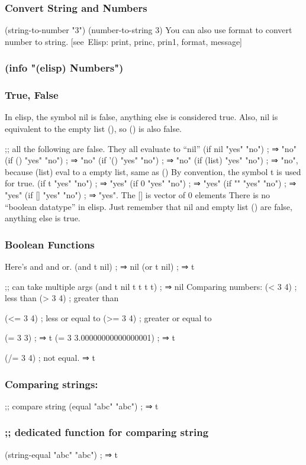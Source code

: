 \documentclass[11pt]{ctexart}
\begin{document}
{{{{\subsubsection{Convert String and Numbers}
\label{sec:org9a754fe}
(string-to-number "3")
(number-to-string 3)
You can also use format to convert number to string. [see Elisp: print, princ, prin1, format, message]
\subsubsection{(info "(elisp) Numbers")}
\label{sec:org49fc04f}
\subsubsection{True, False}
\label{sec:org7d31993}
In elisp, the symbol nil is false, anything else is considered true. Also, nil
is equivalent to the empty list (), so () is also false.

;; all the following are false. They all evaluate to “nil”
(if nil "yes" "no") ; ⇒ "no"
(if () "yes" "no") ; ⇒ "no"
(if '() "yes" "no") ; ⇒ "no"
(if (list) "yes" "no") ; ⇒ "no", because (list) eval to a empty list, same as ()
By convention, the symbol t is used for true.
(if t "yes" "no") ; ⇒ "yes"
(if 0 "yes" "no") ; ⇒ "yes"
(if "" "yes" "no") ; ⇒ "yes"
(if [] "yes" "no") ; ⇒ "yes". The [] is vector of 0 elements
There is no “boolean datatype” in elisp. Just remember that nil and empty list
() are false, anything else is true.

\subsubsection{Boolean Functions}
\label{sec:org4c55eb3}
Here's and and or.
(and t nil) ; ⇒ nil
(or t nil) ; ⇒ t

;; can take multiple args
(and t nil t t t t) ; ⇒ nil
Comparing numbers:
(< 3 4) ; less than
(> 3 4) ; greater than

(<= 3 4) ; less or equal to
(>= 3 4) ; greater or equal to

(= 3 3)   ; ⇒ t
(= 3 3.00000000000000001) ; ⇒ t

(/= 3 4) ; not equal. ⇒ t
\subsubsection{Comparing strings:}
\label{sec:org02bbcff}
;; compare string
(equal "abc" "abc") ; ⇒ t

\subsubsection{;; dedicated function for comparing string}
\label{sec:orgfd55d12}
(string-equal "abc" "abc") ; ⇒ t

}}}}
\end{document}
